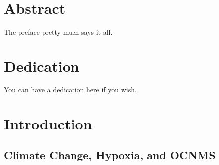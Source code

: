 \documentclass[12pt,twoside]{reedthesis}
\begin{document}
    \tableofcontents
    \listoftables
    \listoffigures

    \chapter*{Abstract}
	The preface pretty much says it all.
	
	\chapter*{Dedication}
	You can have a dedication here if you wish.

  \mainmatter %
  \pagestyle{fancyplain} %


    \chapter*{Introduction}

	

\section{Climate Change, Hypoxia, and OCNMS}
\end{document}
